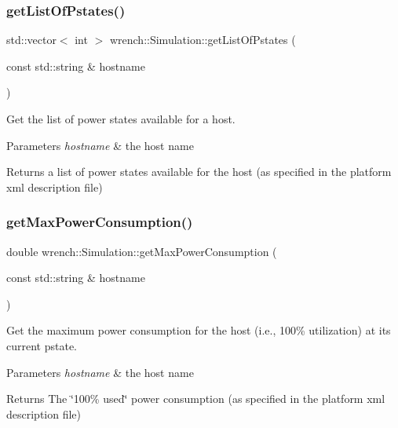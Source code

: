 \subsubsection{\texorpdfstring{get\+List\+Of\+Pstates()}{getListOfPstates()}}
{\footnotesize\ttfamily std\+::vector$<$ int $>$ wrench\+::\+Simulation\+::get\+List\+Of\+Pstates (\begin{DoxyParamCaption}\item[{const std\+::string \&}]{hostname }\end{DoxyParamCaption})\hspace{0.3cm}{\ttfamily [static]}}



Get the list of power states available for a host. 


\begin{DoxyParams}{Parameters}
{\em hostname} & the host name \\
\hline
\end{DoxyParams}
\begin{DoxyReturn}{Returns}
a list of power states available for the host (as specified in the platform xml description file) 
\end{DoxyReturn}
\mbox{\label{classwrench_1_1_simulation_ae76b92ce868c6e6c1683377d869a5b34}} 
\subsubsection{\texorpdfstring{get\+Max\+Power\+Consumption()}{getMaxPowerConsumption()}}
{\footnotesize\ttfamily double wrench\+::\+Simulation\+::get\+Max\+Power\+Consumption (\begin{DoxyParamCaption}\item[{const std\+::string \&}]{hostname }\end{DoxyParamCaption})\hspace{0.3cm}{\ttfamily [static]}}



Get the maximum power consumption for the host (i.\+e., 100\% utilization) at its current pstate. 


\begin{DoxyParams}{Parameters}
{\em hostname} & the host name \\
\hline
\end{DoxyParams}
\begin{DoxyReturn}{Returns}
The \char`\"{}100\% used\char`\"{} power consumption (as specified in the platform xml description file) 
\end{DoxyReturn}
\mbox{\label{classwrench_1_1_simulation_ac0a5ca7331875bc551fc2cf1896e9dd4}} 
